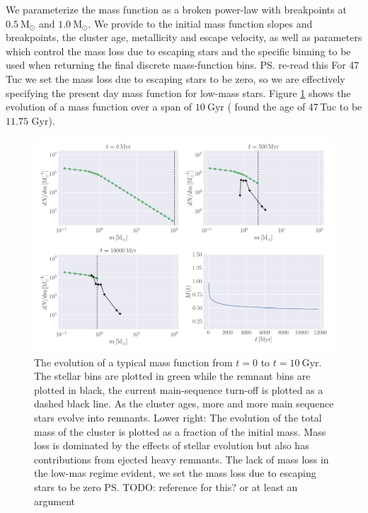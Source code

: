 We parameterize the mass function as a broken power-law with breakpoints at $0.5 \ \mathrm{M}_\odot$
and $1.0 \ \mathrm{M}_\odot$. We provide to \evolvemf{} the initial mass function slopes and
breakpoints, the cluster age, metallicity and escape velocity, as well as parameters which control
the mass loss due to escaping stars and the specific binning to be used when returning the final
discrete mass-function bins.  \ps{re-read this} For 47\,Tuc we set the mass loss due to escaping
stars to be zero, so we are effectively specifying the present day mass function for low-mass stars.
Figure \ref{fig:2/evolve_mf} shows the evolution of a mass function over a span of $10 \
    \mathrm{Gyr}$ (\citealt{Baumgardt2017a} found the age of 47\,Tuc to be $11.75$ Gyr).

\begin{figure}
    \centering
    \includegraphics[width=\textwidth]{figures/evolve_mf.png}
    \caption{The evolution of a typical mass function from $t=0$ to $t=10 \ \mathrm{Gyr}$. The
        stellar bins are plotted in green while the remnant bins are plotted in black, the current
        main-sequence turn-off is plotted as a dashed black line. As the cluster ages, more and more
        main sequence stars evolve into remnants. Lower right: The evolution of the total mass of
        the cluster is plotted as a fraction of the initial mass. Mass loss is dominated by the
        effects of stellar evolution but also has contributions from ejected heavy remnants. The
        lack of mass loss in the low-mas regime evident, we set the mass loss due to escaping stars
        to be zero \ps{TODO: reference for this? or at least an argument}}
    \label{fig:2/evolve_mf}
\end{figure}



